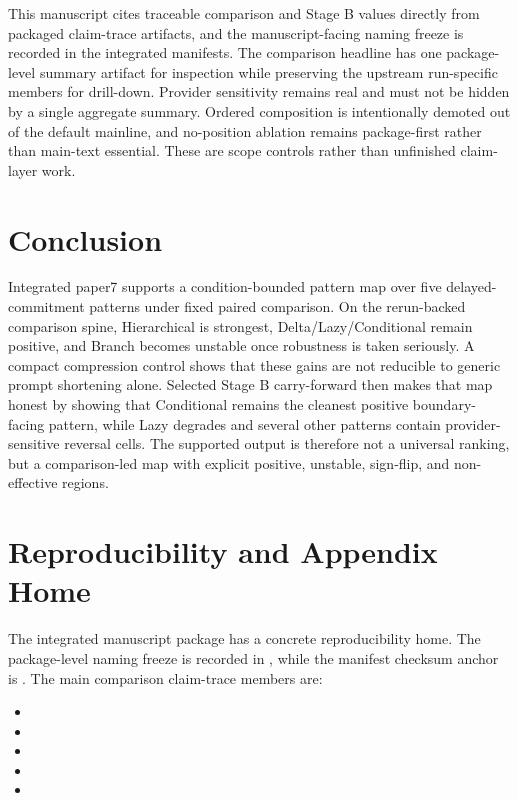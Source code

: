 \documentclass[11pt,a4paper]{article}
\begin{document}
This manuscript cites traceable comparison and Stage B values directly from packaged claim-trace artifacts, and the manuscript-facing naming freeze is recorded in the integrated manifests. The comparison headline has one package-level summary artifact for inspection while preserving the upstream run-specific members for drill-down. Provider sensitivity remains real and must not be hidden by a single aggregate summary. Ordered composition is intentionally demoted out of the default mainline, and no-position ablation remains package-first rather than main-text essential. These are scope controls rather than unfinished claim-layer work.

\section{Conclusion}
\label{sec:conclusion}

Integrated paper7 supports a condition-bounded pattern map over five delayed-commitment patterns under fixed paired comparison. On the rerun-backed comparison spine, Hierarchical is strongest, Delta/Lazy/Conditional remain positive, and Branch becomes unstable once robustness is taken seriously. A compact compression control shows that these gains are not reducible to generic prompt shortening alone. Selected Stage B carry-forward then makes that map honest by showing that Conditional remains the cleanest positive boundary-facing pattern, while Lazy degrades and several other patterns contain provider-sensitive reversal cells. The supported output is therefore not a universal ranking, but a comparison-led map with explicit positive, unstable, sign-flip, and non-effective regions.

\section{Reproducibility and Appendix Home}
\label{sec:repro}

The integrated manuscript package has a concrete reproducibility home. The package-level naming freeze is recorded in , while the manifest checksum anchor is . The main comparison claim-trace members are:
\begin{itemize}
  \item {}
  \item {}
  \item {}
  \item {}
  \item {}
\end{itemize}
\end{document}

